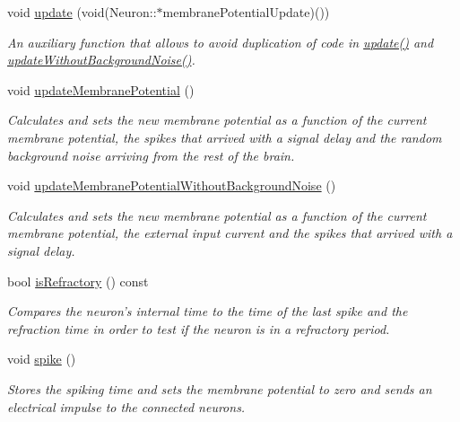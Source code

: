 \begin{DoxyCompactItemize}
\item 
void \hyperlink{classNeuron_a521a967d65a078140cc9c6b8d30240ce}{update} (void(Neuron\-::$\ast$membrane\-Potential\-Update)())
\begin{DoxyCompactList}\small\item\em An auxiliary function that allows to avoid duplication of code in \hyperlink{classNeuron_a782b3b728eee5097ab205a7a7990225b}{update()} and \hyperlink{classNeuron_ababbaa5bc5f7b2e00e0ae5ffcc8fbfdb}{update\-Without\-Background\-Noise()}. \end{DoxyCompactList}\item 
void \hyperlink{classNeuron_a41a81d8527734e59bae39f73fece887f}{update\-Membrane\-Potential} ()
\begin{DoxyCompactList}\small\item\em Calculates and sets the new membrane potential as a function of the current membrane potential, the spikes that arrived with a signal delay and the random background noise arriving from the rest of the brain. \end{DoxyCompactList}\item 
void \hyperlink{classNeuron_a2a3d0130b76a6e1daa0191b97718178b}{update\-Membrane\-Potential\-Without\-Background\-Noise} ()
\begin{DoxyCompactList}\small\item\em Calculates and sets the new membrane potential as a function of the current membrane potential, the external input current and the spikes that arrived with a signal delay. \end{DoxyCompactList}\item 
bool \hyperlink{classNeuron_aa40fbb2b025efb1db420da32e16741c1}{is\-Refractory} () const 
\begin{DoxyCompactList}\small\item\em Compares the neuron's internal time to the time of the last spike and the refraction time in order to test if the neuron is in a refractory period. \end{DoxyCompactList}\item 
void \hyperlink{classNeuron_a955ecfd2984f75c18664bd370c34af1d}{spike} ()
\begin{DoxyCompactList}\small\item\em Stores the spiking time and sets the membrane potential to zero and sends an electrical impulse to the connected neurons. \end{DoxyCompactList}\item 

\end{DoxyCompactItemize}
